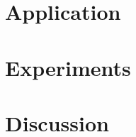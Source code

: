 \chapter{Application}
\label{chp:part}


\chapter{Experiments}
\label{chp:experiments}


\chapter{Discussion}
\label{chp:discussion}

